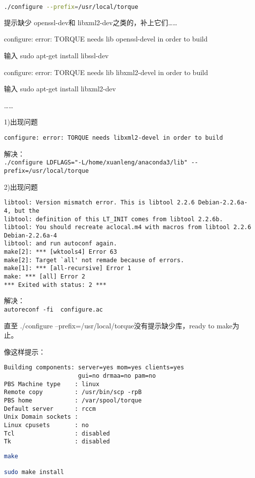 {\begin{lstlisting}[language=sh]
./configure --prefix=/usr/local/torque
\end{lstlisting}

提示缺少 openssl-dev和 libxml2-dev之类的，补上它们……

configure: error: TORQUE needs lib openssl-devel in order to build

输入 sudo apt-get install libssl-dev

configure: error: TORQUE needs lib libxml2-devel in order to build

输入 sudo apt-get install libxml2-dev

……

1)出现问题
\begin{verbatim}
configure: error: TORQUE needs libxml2-devel in order to build
\end{verbatim}

解决：\\
\verb|./configure LDFLAGS="-L/home/xuanleng/anaconda3/lib" --prefix=/usr/local/torque|

2)出现问题
\begin{verbatim}
libtool: Version mismatch error. This is libtool 2.2.6 Debian-2.2.6a-4, but the
libtool: definition of this LT_INIT comes from libtool 2.2.6b.
libtool: You should recreate aclocal.m4 with macros from libtool 2.2.6 Debian-2.2.6a-4
libtool: and run autoconf again.
make[2]: *** [wktools4] Error 63
make[2]: Target `all' not remade because of errors.
make[1]: *** [all-recursive] Error 1
make: *** [all] Error 2
*** Exited with status: 2 ***
\end{verbatim}
解决：\\
\verb|autoreconf -fi  configure.ac |



直至 ./configure --prefix=/usr/local/torque没有提示缺少库，ready to make为止。

像这样提示：
\begin{verbatim}
Building components: server=yes mom=yes clients=yes
                     gui=no drmaa=no pam=no
PBS Machine type    : linux
Remote copy         : /usr/bin/scp -rpB
PBS home            : /var/spool/torque
Default server      : rccm
Unix Domain sockets :
Linux cpusets       : no
Tcl                 : disabled
Tk                  : disabled
\end{verbatim}

\begin{lstlisting}[language=sh]
make

sudo make install
\end{lstlisting}

}
